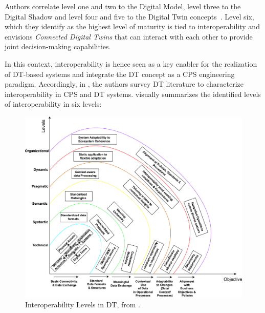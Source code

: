 Authors correlate level one and two to the Digital Model, level three to the Digital Shadow and level four and five to the Digital Twin concepts~\cite{kritzinger2018dtmanufacturing}.
%
Level six, which they identify as the highest level of maturity is tied to interoperability and envisions \emph{Connected Digital Twins} that can interact with each other to provide joint decision-making capabilities. 

In this context, interoperability is hence seen as a key enabler for the realization of \ac{DT}-based systems and integrate the \ac{DT} concept as a \ac{CPS} engineering paradigm. 
%
Accordingly, in \cite{Acharya_Khan_Päivärinta_2024}, the authors survey \ac{DT} literature to characterize interoperability in \ac{CPS} and \ac{DT} systems.
%
 visually summarizes the identified levels of interoperability in six levels: 

\begin{figure}[t]
    \centering
    \includegraphics[width=\textwidth]{figures/interoperability-levels.jpg}
    \caption{Interoperability Levels in \acl{DT}, from \cite{Acharya_Khan_Päivärinta_2024}.}
    \label{fig:dt-interoperability-levels}
\end{figure}


